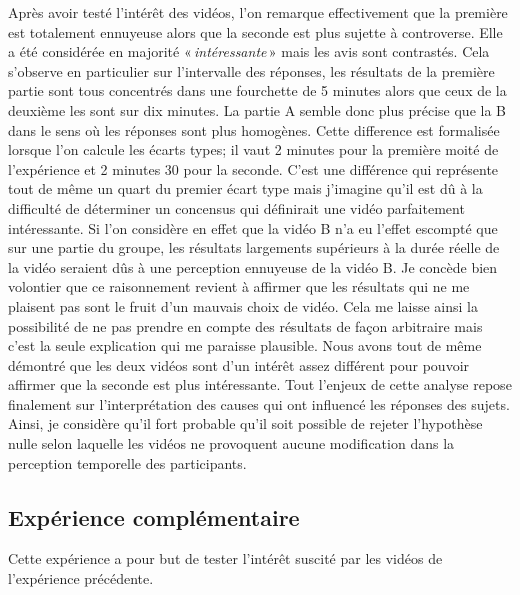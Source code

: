 \documentclass[12pt,fleqn,oneside,french,openany]{book} %
\begin{document}
Après avoir testé l'intérêt des vidéos, l'on remarque effectivement que la première est totalement ennuyeuse alors que la seconde est plus sujette à controverse. Elle a été considérée en majorité «\,\emph{intéressante}\,» mais les avis sont contrastés. Cela s'observe en particulier sur l'intervalle des réponses, les résultats de la première partie sont tous concentrés dans une fourchette de 5 minutes alors que ceux de la deuxième les sont sur dix minutes. La partie A semble donc plus précise que la B dans le sens où les réponses sont plus homogènes. Cette difference est formalisée lorsque l'on calcule les écarts types; il vaut 2 minutes pour la première moité de l'expérience et 2 minutes 30 pour la seconde. C'est une différence qui représente tout de même un quart du premier écart type mais j'imagine qu'il est dû à la difficulté de déterminer un concensus qui définirait une vidéo parfaitement intéressante. Si l'on considère en effet que la vidéo B n'a eu l'effet escompté que sur une partie du groupe, les résultats largements supérieurs à la durée réelle de la vidéo seraient dûs à une perception ennuyeuse de la vidéo B. Je concède bien volontier que ce raisonnement revient à affirmer que les résultats qui ne me plaisent pas sont le fruit d'un mauvais choix de vidéo. Cela me laisse ainsi la possibilité de ne pas prendre en compte des résultats de façon arbitraire mais c'est la seule explication qui me paraisse plausible. Nous avons tout de même démontré que les deux vidéos sont d'un intérêt assez différent pour pouvoir affirmer que la seconde est plus intéressante. Tout l'enjeux de cette analyse repose finalement sur l'interprétation des causes qui ont influencé les réponses des sujets. Ainsi, je considère qu'il fort probable qu'il soit possible de rejeter l'hypothèse nulle selon laquelle les vidéos ne provoquent aucune modification dans la perception temporelle des participants.


\clearpage

\subsection{Expérience complémentaire} \label{ssec:exp1.2}
Cette expérience a pour but de tester l'intérêt suscité par les vidéos de l'expérience précédente. 
\end{document}

